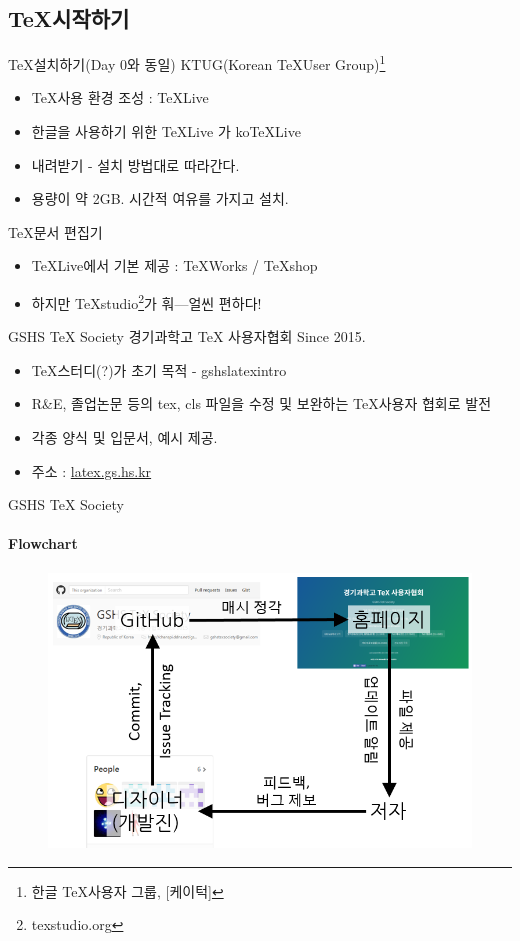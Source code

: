 \documentclass[12pt]{beamer}
\begin{document}
\subsection{\TeX 시작하기}
\begin{frame}{\TeX 설치하기{\normalsize (Day 0와 동일)}}
	KTUG(Korean \TeX User Group)\footnote{한글 \TeX 사용자 그룹, [케이턱]}
	\begin{itemize}
		\item \TeX 사용 환경 조성 : TeXLive
		\item 한글을 사용하기 위한 TeXLive 가 koTeXLive
		\item 내려받기 - 설치 방법대로 따라간다.
		\item 용량이 약 2GB. 시간적 여유를 가지고 설치.
	\end{itemize}
	\TeX 문서 편집기
	\begin{itemize}
		\item TeXLive에서 기본 제공 : TeXWorks / TeXshop
		\item 하지만 TeXstudio\footnote{texstudio.org}가 훠---얼씬 
		편하다!
	\end{itemize}
\end{frame}
\begin{frame}{GSHS TeX Society}
	경기과학고 TeX 사용자협회 Since 2015.
	\begin{itemize}
		\item \TeX 스터디(?)가 초기 목적 - gshslatexintro
		\item R\&E, 졸업논문 등의 tex, cls 파일을 수정 및 보완하는 \TeX 사용자 협회로 발전
	\end{itemize}
	\begin{itemize}
		\item 각종 양식 및 입문서, 예시 제공.
		\item 주소 : \url{latex.gs.hs.kr}
	\end{itemize}
\end{frame}
\begin{frame}{GSHS TeX Society}
	\framesubtitle{Flowchart}
	\begin{figure}[h]
		\centering
		\includegraphics[width=\textwidth]{gshstexsociety.png}
	\end{figure}
\end{frame}
\end{document}
